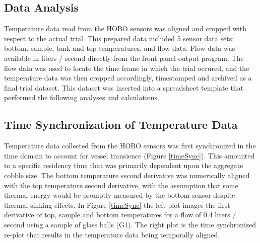 \doublespacing

\begin{center}
\section{Data Analysis}
\end{center}

Temperature data read from the HOBO sensors was aligned and cropped with respect to the actual trial. This prepared data included 5 sensor data sets: bottom, sample, tank and top temperatures, and flow data. Flow data was available in liters / second directly from the front panel output program. The flow data was used to locate the time frame in which the trial occured, and the temperature data was then cropped accordingly, timestamped and archived as a final trial dataset. This dataset was inserted into a spreadsheet template that performed the following analyses and calculations.

\subsection{Time Synchronization of Temperature Data}
Temperature data collected from the HOBO sensors was first synchronized in the time domain to account for vessel transience (Figure \ref{timeSync}). This amounted to a specific residency time that was primarily dependent upon the aggregate cobble size. The bottom temperature second derivative was numerically aligned with the top temperature second derivative, with the assumption that some thermal energy would be promptly measured by the bottom sensor despite thermal sinking effects. In Figure \ref{timeSync} the left plot images the first derivative of top, sample and bottom temperatures for a flow of 0.4 liters / second using a sample of glass balls (G1). The right plot is the time synchronized re-plot that results in the temperature data being temporally aligned. 

